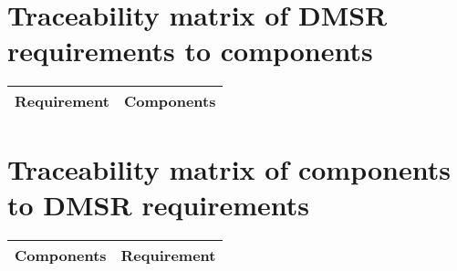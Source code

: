 \section{Traceability matrix of DMSR requirements to components \label{sect:tracefor}}
\begin{longtable}{|p{}|p{}|}\hline
{\bf Requirement} & {\bf Components}\\ \hline

\end{longtable}
\section{Traceability matrix of components to DMSR requirements \label{sect:traceback}}
\begin{longtable}{|p{}|p{}|}\hline
{\bf Components} & {\bf Requirement}\\ \hline

\end{longtable}
